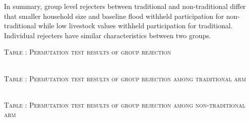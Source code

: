 	In summary, group level rejecters between \textsf{traditional} and non-\textsf{traditional} differ that smaller household size and baseline flood withheld participation for non-\textsf{traditional} while low livestock values withheld participation for \textsf{traditional}. Individual rejecters have similar characteristics between two groups.

\hfil\begin{minipage}[t]{14cm}
\hfil\textsc{\normalsize Table \thetable: Permutation test results of group rejection\label{tab Greject perm}}\\
\setlength{\tabcolsep}{.5pt}
\setlength{\baselineskip}{8pt}
\renewcommand{\arraystretch}{.50}
\hfil{}\\

\hfil\textsc{\normalsize Table \thetable: Permutation test results of group rejection among traditional arm\label{tab Greject trad perm}}\\
\setlength{\tabcolsep}{.5pt}
\setlength{\baselineskip}{8pt}
\renewcommand{\arraystretch}{.50}
\hfil{}\\

\hfil\textsc{\normalsize Table \thetable: Permutation test results of group rejection among non-traditional arm\label{tab Greject nontrad perm}}\\
\setlength{\tabcolsep}{.5pt}
\setlength{\baselineskip}{8pt}
\renewcommand{\arraystretch}{.50}
\hfil{}\\


\end{minipage}
